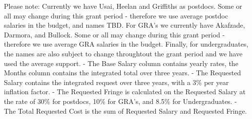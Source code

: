 \documentclass[11pt]{article}
\begin{document}
Please note: Currently we have Usai, Heelan and Griffiths as postdocs. Some or all may change during this grant 
period - therefore we use average postdoc salaries in the budget, and names TBD. For GRA's we currently have 
Akafzade,  Darmora, and Bullock. Some or all may change during this grant period - therefore we use average GRA salaries in the budget.
Finally, for undergraduates, the names are also subject to change throughtout the grant period and we have 
used the average support.
- The Base Salary column contains yearly rates, the Months column contains the integrated total over three years.
- The Requested Salary contains the integrated request over three years, with a 3\% per year inflation factor.
- The Requested Fringe is calculated on the Requested Salary at the rate of 30\% for postdocs, 10\% for GRA's,
  and 8.5\% for Undergraduates.
- The Total Requested Cost is the sum of Requested Salary and Requested Fringe.
\end{document}
